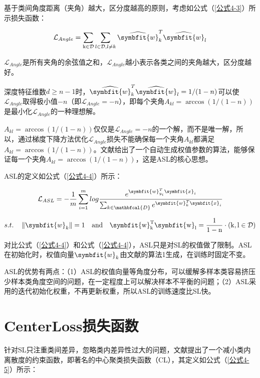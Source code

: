 基于类间角度距离（夹角）越大，区分度越高的原则，考虑如公式（\ref{公式4-3}）所示损失函数：

\begin{equation}\label{公式4-3}
	\mathcal{L}_{Angle}=\sum_{\mathrm{k} \in \mathcal{D}} \sum_{l \in \mathcal{D}, l \neq k} \widehat{\symbfit{w}}_{k}^{T} \widehat{\symbfit{w}}_{l}
\end{equation}

$\mathcal{L}_{Angle}$是所有夹角的余弦值之和，$\mathcal{L}_{Angle}$越小表示各类之间的夹角越大，区分度越好。


深度特征维数$d\geq n-1$时，$\widehat{\symbfit{w}}_{k}^{T} \widehat{\symbfit{w}}_{l}=1 /(1-n)$可以使$\mathcal{L}_{Angle}$取得极小值$-n$（即$\mathcal{L}_{Angle}=-n$），即每个夹角$A_{k l}=\arccos (1 /(1-n))$是最小化$\mathcal{L}_{Angle}$的一种理想解。

$A_{k l}=\arccos (1 /(1-n))$仅仅是$\mathcal{L}_{Angle}=-n$的一个解，而不是唯一解，所以，通过梯度下降方法优化$\mathcal{L}_{Angle}$损失不能确保每一个夹角$A_{kl}$都满足$A_{k l}=\arccos (1 /(1-n))$。文献\cite{66}给出了一个自动生成权值参数的算法，能够保证每一个夹角$A_{k l}=\arccos (1 /(1-n))$，这是ASL的核心思想。

ASL的定义如公式（\ref{公式4-4}）所示：

\begin{equation}\label{公式4-4}
		\mathcal{L}_{ASL}=-\frac{1}{m}\sum_{i=1}^{m}{log\frac{e^{\symbfit{w}_{y_i}^T\symbfit{x}_i}}{\sum_{k\in\mathbfcal{D}} e^{\symbfit{w}_k^T\symbfit{x}_i}}}  	
\end{equation}

$$
s.t. \quad \left\|\symbfit{w}_{k}\right\|=1 \quad \rm{and} \quad \symbfit{w}_{k}^{T} \symbfit{w}_{l}=\frac{1}{1-n} \cdot(k, l \in \mathcal{D})
$$

对比公式（\ref{公式4-4}）和公式（\ref{公式4-4}），ASL只是对SL的权值做了限制。ASL在初始化时，权值向量$\symbfit{w}_k$由文献\cite{66}的算法1生成，在训练时固定不变。

ASL的优势有两点：（1）ASL的权值向量等角度分布，可以缓解多样本类容易挤压少样本类角度空间的问题，在一定程度上可以解决样本不平衡的问题；（2）ASL采用的迭代初始化权重，不再更新权重，所以ASL的训练速度比SL快。

\section{CenterLoss损失函数}

针对SL只注重类间差异，忽略类内差异性过大的问题，文献\cite{64}提出了一个减小类内离散度的约束函数，即著名的中心聚类损失函数（CL），其定义如公式（\ref{公式4-5}）所示：


